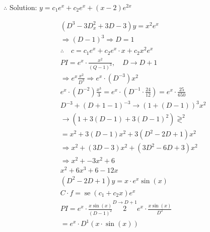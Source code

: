 $\therefore$ Solution: $y=c_{1} e^{x}+c_{2} e^{x}+(x-2) e^{2 x}$


\begin{align*}
	 & \left(D^{3}-3 D_{x}^{2}+3 D-3\right) y=x^2 e^{x}                                                                             \\
	 & \Rightarrow(D-1)^{3} \Rightarrow D=1                                                                                         \\
	 & \therefore \quad c=c_{1} e^{x}+c_{2} e^{x} \cdot x+c_{2} x^2 e^{x}                                                           \\
	 & P I=e^{x} \cdot \frac{x^2 }{(Q-1)^{3}}, \quad D \rightarrow D+1                                                              \\
	 & \Rightarrow e^{x} \frac{x^2 }{D^{3}} \Rightarrow e^{x} \cdot\left(D^{-3}\right) x^2                                          \\
	 & e^{x} \cdot\left(D^{-2}\right) \frac{x^{3}}{3}=e^{x} \cdot\left(D^{-1} \cdot \frac{24}{12}\right)=e^{x} \cdot \frac{25}{650} \\
	 & D^{-3}+(D+1-1)^{-3} \rightarrow(1+(D-1))^{3} x^2                                                                             \\
	 & \rightarrow\left(1+3(D-1)+3(D-1)^{2}\right) \gtrless^{2}                                                                     \\
	 & =x^2 +3(D-1) x^2 +3\left(D^{2}-2 D+1\right) x^2                                                                              \\
	 & \Rightarrow x^2 +(3 D-3) x^2 +\left(3 D^{2}-6 D+3\right) x^2                                                                 \\
	 & \Rightarrow x^2 +-3 x^2 +6                                                                                                   \\
	 & x^2 +6 x^{3}+6-12 x  \tag{1}                                                                                                 \\
	 & \left(D^{2}-2 D+1\right) y=x \cdot e^{x} \sin(x)                                                                             \\
	 & C \cdot f=\operatorname{se}\left(c_{1}+c_{2} x\right) e^{x}                                                                  \\
	 & P I=e^{x} \cdot \frac{x \sin(x)}{(D-1)^{2}} \stackrel{D \rightarrow D+1}{2} e^{x} \cdot \frac{x \sin(x)}{D^{2}}              \\
	 & =e^{x} \cdot D^{1}(x \cdot \sin(x))
\end{align*}


